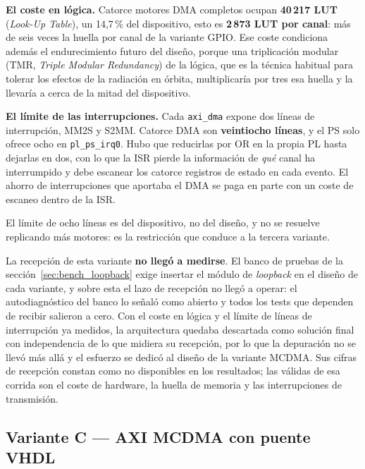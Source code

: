 \textbf{El coste en lógica.} Catorce motores DMA completos ocupan \textbf{40\,217 LUT}
(\textit{Look-Up Table}), un 14,7\,\% del dispositivo, esto es \textbf{2\,873 LUT por canal}: más
de seis veces la huella por canal de la variante GPIO. Ese coste condiciona además el
endurecimiento futuro del diseño, porque una triplicación modular (TMR, \textit{Triple Modular
Redundancy}) de la lógica, que es la técnica habitual para tolerar los efectos de la radiación en
órbita, multiplicaría por tres esa huella y la llevaría a cerca de la mitad del dispositivo.

\textbf{El límite de las interrupciones.} Cada \texttt{axi\_dma} expone dos líneas de
interrupción, MM2S y S2MM. Catorce DMA son \textbf{veintiocho líneas}, y el PS solo ofrece ocho
en \texttt{pl\_ps\_irq0}. Hubo que reducirlas por OR en la propia PL hasta dejarlas en dos, con
lo que la ISR pierde la información de \textit{qué} canal ha interrumpido y debe escanear los
catorce registros de estado en cada evento. El ahorro de interrupciones que aportaba el DMA se
paga en parte con un coste de escaneo dentro de la ISR.

El límite de ocho líneas es del dispositivo, no del diseño, y no se resuelve replicando más
motores: es la restricción que conduce a la tercera variante.

La recepción de esta variante \textbf{no llegó a medirse}. El banco de pruebas de la
sección~\ref{sec:bench_loopback} exige insertar el módulo de \textit{loopback} en el diseño de
cada variante, y sobre esta el lazo de recepción no llegó a operar: el autodiagnóstico del banco
lo señaló como abierto y todos los tests que dependen de recibir salieron a cero. Con el coste en
lógica y el límite de líneas de interrupción ya medidos, la arquitectura quedaba descartada como
solución final con independencia de lo que midiera su recepción, por lo que la depuración no se
llevó más allá y el esfuerzo se dedicó al diseño de la variante MCDMA. Sus cifras de recepción
constan como no disponibles en los resultados; las válidas de esa corrida son el coste de
hardware, la huella de memoria y las interrupciones de transmisión.

\subsection{Variante C --- AXI MCDMA con puente VHDL}

